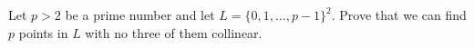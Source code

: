 Let $p>2$ be a prime number and let $L=\{0,1,\dots,p-1\}^2$. Prove that we can find $p$ points in $L$ with no three of them collinear.